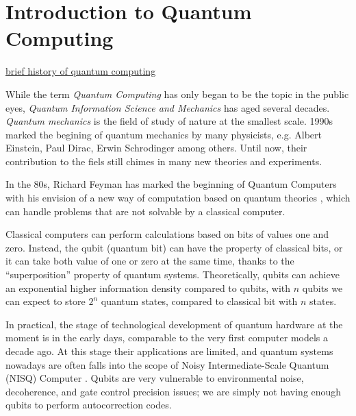 \section{Introduction to Quantum Computing} \label{Sec: Introduction to Quantum Computing}

\href{https://www.sri.com/story/a-brief-introduction-to-quantum-computing/#:~:text=Quantum%20computing%20is%20generally%20viewed,the%20atomic%20and%20subatomic%20level.}{brief history of quantum computing}

While the term \emph{Quantum Computing} has only began to be the topic in the public eyes, \emph{Quantum Information Science and Mechanics} has aged several decades.
\emph{Quantum mechanics} is the field of study of nature at the smallest scale.
1990s marked the begining of quantum mechanics by many physicists, e.g. Albert Einstein, Paul Dirac, Erwin Schrodinger among others.
Until now, their contribution to the fiels still chimes in many new theories and experiments.

In the 80s, Richard Feyman has marked the beginning of Quantum Computers with his envision of a new way of computation based on quantum theories \cite{feynmanSimulatingPhysicsComputers1982}, which can handle problems that are not solvable by a classical computer.

Classical computers can perform calculations based on bits of values one and zero. 
Instead, the qubit (quantum bit) can have the property of classical bits, or it can take both value of one or zero at the same time, thanks to the ``superposition'' property of quantum systems.
Theoretically, qubits can achieve an exponential higher information density compared to qubits, with $n$ qubits we can expect to store $2^n$ quantum states, compared to classical bit with $n$ states.

In practical, the stage of technological development of quantum hardware at the moment is in the early days, comparable to the very first computer models a decade ago.
At this stage their applications are limited, and quantum systems nowadays are often falls into the scope of Noisy Intermediate-Scale Quantum (NISQ) Computer \cite{brooksQuantumSupremacyHunt2019}.
Qubits are very vulnerable to environmental noise, decoherence, and gate control precision issues; we are simply not having enough qubits to perform autocorrection codes.